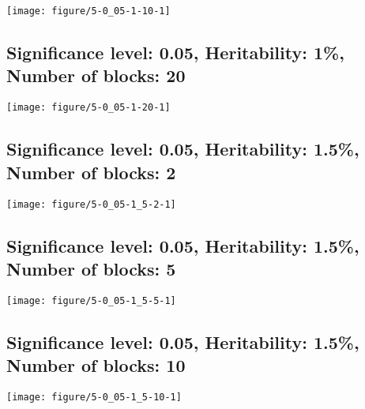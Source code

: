 \documentclass[11pt,letter]{article}\usepackage[]{graphicx}\usepackage[]{color}
\makeatletter
\def\maxwidth{ %
  \ifdim\Gin@nat@width>\linewidth
    \linewidth
  \else
    \Gin@nat@width
  \fi
}
\newenvironment{knitrout}{}{} %
\makeatother
\begin{document}
\begin{knitrout}
\color{fgcolor}
\texttt{[image: figure/5-0\_05-1-10-1]} 

\end{knitrout}

\newpage
\subsection{Significance level: 0.05, Heritability: 1\%, Number of blocks: 20}

\begin{knitrout}
\color{fgcolor}
\texttt{[image: figure/5-0\_05-1-20-1]} 

\end{knitrout}

\newpage
\subsection{Significance level: 0.05, Heritability: 1.5\%, Number of blocks: 2}

\begin{knitrout}
\color{fgcolor}
\texttt{[image: figure/5-0\_05-1\_5-2-1]} 

\end{knitrout}

\newpage
\subsection{Significance level: 0.05, Heritability: 1.5\%, Number of blocks: 5}

\begin{knitrout}
\color{fgcolor}
\texttt{[image: figure/5-0\_05-1\_5-5-1]} 

\end{knitrout}

\newpage
\subsection{Significance level: 0.05, Heritability: 1.5\%, Number of blocks: 10}

\begin{knitrout}
\color{fgcolor}
\texttt{[image: figure/5-0\_05-1\_5-10-1]} 

\end{knitrout}
\end{document}
